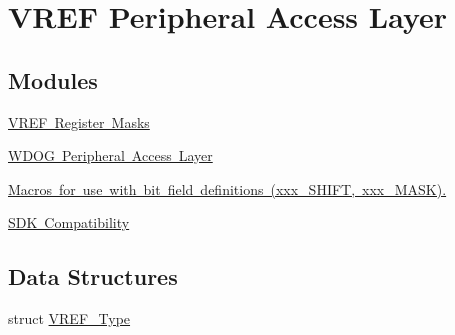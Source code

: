 \hypertarget{group___v_r_e_f___peripheral___access___layer}{}\section{V\+R\+EF Peripheral Access Layer}
\label{group___v_r_e_f___peripheral___access___layer}
\subsection*{Modules}
\begin{DoxyCompactItemize}
\item 
\mbox{\hyperlink{group___v_r_e_f___register___masks}{V\+R\+E\+F Register Masks}}
\item 
\mbox{\hyperlink{group___w_d_o_g___peripheral___access___layer}{W\+D\+O\+G Peripheral Access Layer}}
\item 
\mbox{\hyperlink{group___bit___field___generic___macros}{Macros for use with bit field definitions (xxx\+\_\+\+S\+H\+I\+F\+T, xxx\+\_\+\+M\+A\+S\+K).}}
\item 
\mbox{\hyperlink{group___s_d_k___compatibility___symbols}{S\+D\+K Compatibility}}
\end{DoxyCompactItemize}
\subsection*{Data Structures}
\begin{DoxyCompactItemize}
\item 
struct \mbox{\hyperlink{struct_v_r_e_f___type}{V\+R\+E\+F\+\_\+\+Type}}
\end{DoxyCompactItemize}
